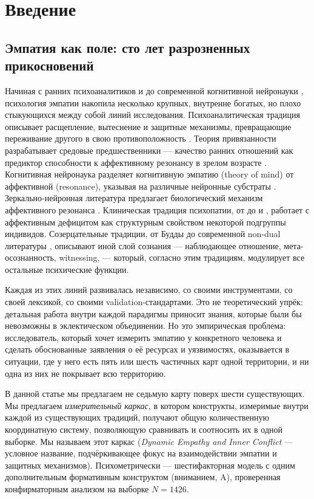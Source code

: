 \section{Введение}
\label{sec:introduction}

\subsection{Эмпатия как поле: сто лет разрозненных прикосновений}

Начиная с ранних психоаналитиков \citep{ferenczi1933, klein1946} и до современной когнитивной нейронауки \citep{decety2011, singer2014}, психология эмпатии накопила несколько крупных, внутренне богатых, но плохо стыкующихся между собой линий исследования. Психоаналитическая традиция описывает расщепление, вытеснение и защитные механизмы, превращающие переживание другого в свою противоположность \citep{freud1915, fairbairn1952, bion1962, fonagy2002}. Теория привязанности разрабатывает средовые предшественники --- качество ранних отношений как предиктор способности к аффективному резонансу в зрелом возрасте \citep{bowlby1969, main1986, lyonsruth1999}. Когнитивная нейронаука разделяет когнитивную эмпатию (theory of mind) от аффективной (resonance), указывая на различные нейронные субстраты \citep{shamaytsoory2011, decety2011}. Зеркально-нейронная литература предлагает биологический механизм аффективного резонанса \citep{rizzolatti2004, iacoboni2009}. Клиническая традиция психопатии, от \citet{cleckley1941} до \citet{hare1991} и \citet{blair2013}, работает с аффективным дефицитом как структурным свойством некоторой подгруппы индивидов. Созерцательные традиции, от Будды до современной non-dual литературы \citep{godman1985, dunne2011, josipovic2014}, описывают иной слой сознания --- наблюдающее отношение, мета-осознанность, witnessing, --- который, согласно этим традициям, модулирует все остальные психические функции.

Каждая из этих линий развивалась независимо, со своими инструментами, со своей лексикой, со своими validation-стандартами. Это не теоретический упрёк: детальная работа внутри каждой парадигмы приносит знания, которые были бы невозможны в эклектическом объединении. Но это эмпирическая проблема: исследователь, который хочет измерить эмпатию у конкретного человека и сделать обоснованные заявления о её ресурсах и уязвимостях, оказывается в ситуации, где у него есть пять или шесть частичных карт одной территории, и ни одна из них не покрывает всю территорию.

В данной статье мы предлагаем не седьмую карту поверх шести существующих. Мы предлагаем \emph{измерительный каркас}, в котором конструкты, измеримые внутри каждой из существующих традиций, получают общую количественную координатную систему, позволяющую сравнивать и соотносить их в одной выборке. Мы называем этот каркас \DEIC{} (\textit{Dynamic Empathy and Inner Conflict} --- условное название, подчёркивающее фокус на взаимодействии эмпатии и защитных механизмов). Психометрически \DEIC{} --- шестифакторная модель с одним дополнительным формативным конструктом (вниманием, A), проверенная конфирматорным анализом на выборке $N = 1426$.

